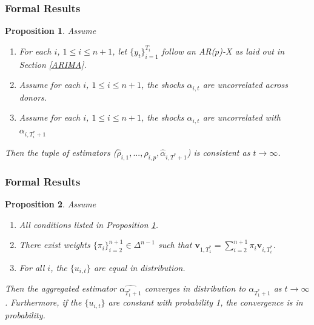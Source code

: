 \documentclass[9pt]{beamer}
\newcommand{\weight}{\pi}
\newtheorem{prop}{Proposition}
\theoremstyle{definition}
\begin{document}
\begin{frame}\frametitle{Formal Results}

    \begin{prop}\label{ARIMA_param_consistency}
        Assume
          \begin{enumerate}
            \item For each $i$, $1\leq i \leq n + 1$, let $\{y_{t}\}^{T_{i}}_{i=1}$ follow an AR($p$)-X as laid out in Section \ref{ARIMA}.
            \item Assume for each $i$, $1\leq i \leq n + 1$, the shocks $\alpha_{i,t}$ are uncorrelated across donors.
            \item Assume for each $i$, $1\leq i \leq n + 1$, the shocks $\alpha_{i,t}$ are uncorrelated with $\alpha_{i,T_{i}^{*}+1}$ 
           \end{enumerate}
        
        Then the tuple of estimators ($\hat\rho_{i,1},...,\hat\rho_{i, p}, \hat\alpha_{i,T^{*}+1}$) is consistent as $t \rightarrow \infty$.
        \end{prop}

    \end{frame}

        \begin{frame}\frametitle{Formal Results}
        
        \begin{prop}\label{ARIMA_aggregated_alpha}
        Assume
          \begin{enumerate}
            \item All conditions listed in Proposition \ref{ARIMA_param_consistency}.
            \item There exist weights $\{\pi_{i}\}_{i=2}^{n+1} \in \Delta^{n-1}$  such that $\textbf{v}_{1,T_{1}^{*}} = \sum^{n+1}_{i=2}\weight_{i} \textbf{v}_{i,T_{i}^{*}}$.
            \item For all $i$, the $\{u_{i,t}\}$ are equal in distribution.
           \end{enumerate}
        
           Then the aggregated estimator $\hat{\alpha_{T^{*}_{1}+1}}$ converges in distribution to $\alpha_{T^{*}_{1}+1}$ as $t \rightarrow \infty$.  Furthermore, if the $\{u_{i,t}\}$ are constant with probability 1, the convergence is in probability.
          \end{prop}

        \end{frame}
\end{document}
